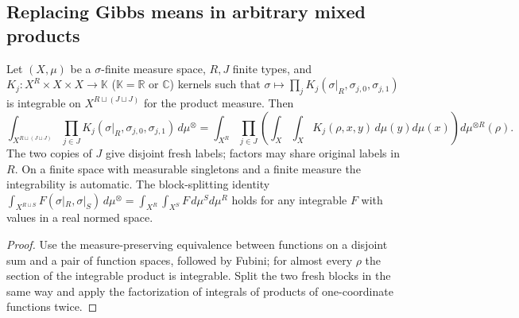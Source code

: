 \subsection{Replacing Gibbs means in arbitrary mixed products}

\begin{lemma}
\label{lem:sg-tal:fresh-pair-product}
\leanok
{}
Let $(X,\mu)$ be a $\sigma$-finite measure space, $R,J$ finite types, and
$K_j:X^R\times X\times X\to\mathbb K$ ($\mathbb K=\mathbb R$ or $\mathbb C$) kernels such that
$\sigma\mapsto\prod_{j}K_j(\sigma|_R,\sigma_{j,0},\sigma_{j,1})$ is integrable on
$X^{R\sqcup(J\sqcup J)}$ for the product measure. Then
\[
 \int_{X^{R\sqcup(J\sqcup J)}}
   \prod_{j\in J} K_j(\sigma|_R,\sigma_{j,0},\sigma_{j,1})\,d\mu^{\otimes}
 =\int_{X^R}\prod_{j\in J}
   \left(\int_X\int_X K_j(\rho,x,y)\,d\mu(y)d\mu(x)\right)d\mu^{\otimes R}(\rho).
\]
The two copies of $J$ give disjoint fresh labels; factors may share original labels in $R$.
On a finite space with measurable singletons and a finite measure the integrability is automatic.
The block-splitting identity
$\int_{X^{R\sqcup S}}F(\sigma|_R,\sigma|_S)\,d\mu^{\otimes}=\int_{X^R}\int_{X^S}F\,d\mu^{S}d\mu^{R}$
holds for any integrable $F$ with values in a real normed space.
\end{lemma}
\begin{proof}
\leanok
Use the measure-preserving equivalence between functions on a disjoint sum
and a pair of function spaces, followed by Fubini; for almost every $\rho$ the section of the
integrable product is integrable. Split the two fresh blocks in the same way and apply the
factorization of integrals of products of one-coordinate functions twice.
\end{proof}

